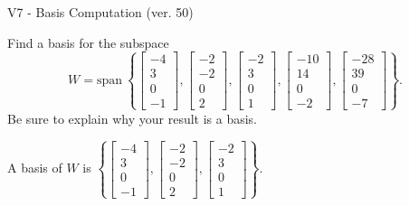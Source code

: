 \begin{exercise}
  \begin{exerciseTitle}V7 - Basis Computation (ver. 50)\end{exerciseTitle}
  \begin{exerciseStatement}
    Find a basis for the subspace 
\[W=\mathrm{span}\ \left\{\left[\begin{array}{r}
-4 \\
3 \\
0 \\
-1
\end{array}\right] , \left[\begin{array}{r}
-2 \\
-2 \\
0 \\
2
\end{array}\right] , \left[\begin{array}{r}
-2 \\
3 \\
0 \\
1
\end{array}\right] , \left[\begin{array}{r}
-10 \\
14 \\
0 \\
-2
\end{array}\right] , \left[\begin{array}{r}
-28 \\
39 \\
0 \\
-7
\end{array}\right]\right\}.\]
 Be sure to explain why your result is a basis.


  \end{exerciseStatement}
  \begin{exerciseAnswer}
   A basis of \(W\) is  \(\left\{\left[\begin{array}{r}
-4 \\
3 \\
0 \\
-1
\end{array}\right] , \left[\begin{array}{r}
-2 \\
-2 \\
0 \\
2
\end{array}\right] , \left[\begin{array}{r}
-2 \\
3 \\
0 \\
1
\end{array}\right]\right\}\).
  


  \end{exerciseAnswer}
\end{exercise}